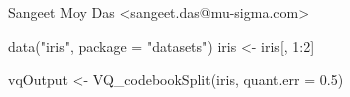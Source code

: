 \documentclass[letterpaper]{book}
\begin{document}
%
\begin{Author}
Sangeet Moy Das <sangeet.das@mu-sigma.com>
\end{Author}
%
\begin{SeeAlso}
\end{SeeAlso}
%
\begin{Examples}
\begin{ExampleCode}


data("iris", package = "datasets")
iris <- iris[, 1:2]

vqOutput <- VQ_codebookSplit(iris, quant.err = 0.5)

\end{ExampleCode}
\end{Examples}
\printindex{}
\end{document}
